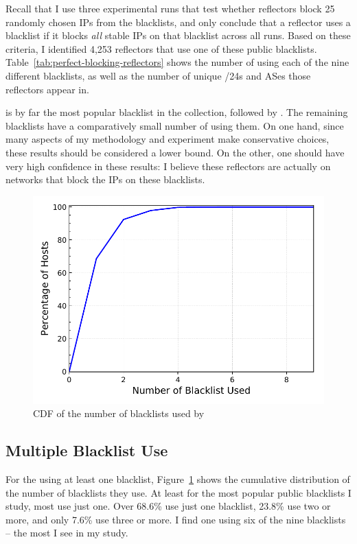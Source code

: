 Recall that I use three experimental runs that test whether
reflectors block 25 randomly chosen IPs from the blacklists, and only
conclude that a reflector uses a blacklist if it blocks {\em all}
stable IPs on that blacklist across all runs.  Based on these criteria,
I identified 4,253 reflectors that use one of these public
blacklists.  Table~\ref{tab:perfect-blocking-reflectors} shows the
number of {} using each of the nine different blacklists,
as well as the number of unique /24s and ASes those reflectors appear
in.

{\spamhausdrop} is by far the most popular blacklist in the
collection, followed by {\spamhausedrop}.  The remaining blacklists
have a comparatively small number of {} using them.  On one
hand, since many aspects of my methodology and experiment make
conservative choices, these results should be considered a lower
bound.  On the other, one should have very high confidence in these results:
I believe these reflectors are actually on networks that block the
IPs on these blacklists.


\begin{figure}[t]
  \centering
  \includegraphics[width=0.8\linewidth]{data_usage/images/perfect_shared_cdf_v2.pdf}
  \caption{CDF of the number of blacklists used by {}}
  \label{fig:perfect-shared-cdf}
\end{figure}

\subsection{Multiple Blacklist Use}

For the {} using at least one blacklist,
Figure~\ref{fig:perfect-shared-cdf} shows the cumulative distribution
of the number of blacklists they use.  At least for the most popular
public blacklists I study, most use just one.  Over 68.6\% use just
one blacklist, 23.8\% use two or more, and only 7.6\% use three or more.
I find one {} using six of the nine blacklists -- the most
I see in my study.

